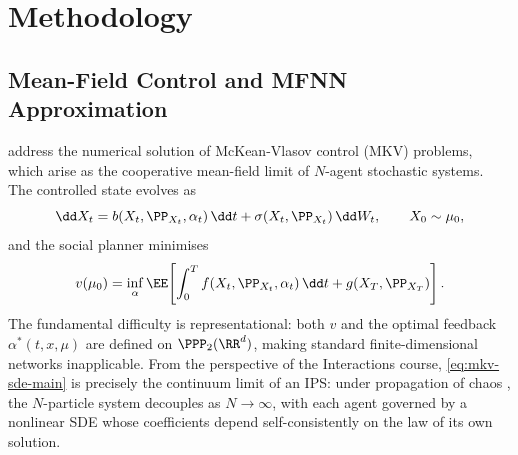 \documentclass[11pt]{article}
\begin{document}
\section{Methodology}

\subsection{Mean-Field Control and MFNN Approximation}

\citet{pham2024mfnn} address the numerical solution of McKean-Vlasov control (MKV) problems, which arise as the cooperative mean-field limit of $N$-agent stochastic systems. The controlled state evolves as
\begin{equation}\label{eq:mkv-sde-main}
  \dd X_t = b(X_t, \PP_{X_t}, \alpha_t)\,\dd t + \sigma(X_t, \PP_{X_t})\,\dd W_t, \qquad X_0 \sim \mu_0,
\end{equation}
and the social planner minimises
\begin{equation}\label{eq:mkv-cost-main}
  v(\mu_0) = \inf_\alpha \EE\!\left[\int_0^T f(X_t, \PP_{X_t}, \alpha_t)\,\dd t + g(X_T, \PP_{X_T})\right].
\end{equation}
The fundamental difficulty is representational: both $v$ and the optimal feedback $\alpha^*(t, x, \mu)$ are defined on $\PPP_2(\RR^d)$, making standard finite-dimensional networks inapplicable. From the perspective of the Interactions course, \eqref{eq:mkv-sde-main} is precisely the continuum limit of an IPS: under propagation of chaos \citep{sznitman1991propagation}, the $N$-particle system decouples as $N \to \infty$, with each agent governed by a nonlinear SDE whose coefficients depend self-consistently on the law of its own solution.
\end{document}
